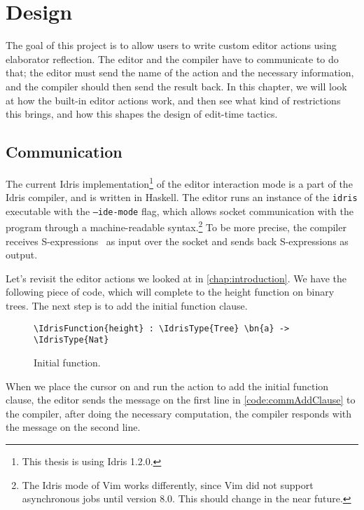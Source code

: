 \chapter{Design}\label{chap:design}
The goal of this project is to allow users to write custom editor actions using
elaborator reflection.
The editor and the compiler have to communicate to do that; the editor must
send the name of the action and the necessary information, and the
compiler should then send the result back.
In this chapter, we will look at how the built-in editor actions work, and then
see what kind of restrictions this brings, and how this shapes the design of
edit-time tactics.

\section{Communication}\label{sec:communication}

The current Idris implementation\footnote{This thesis is using Idris 1.2.0.} of
the editor interaction mode is a part of the Idris compiler, and is written in
Haskell.
The editor runs an instance of the \texttt{idris} executable with the
\texttt{--ide-mode} flag, which
allows socket communication with the program through a machine-readable
syntax.\footnote{The Idris mode of Vim works differently, since Vim did not
support asynchronous jobs until version 8.0. This should change in the near future.}
To be more precise, the compiler receives S-expressions~\cite{mccarthy} as input
over the socket and sends back S-expressions as output.

Let's revisit the editor actions we looked at in \autoref{chap:introduction}.
We have the following piece of code, which will complete to the height function
on binary trees. The next step is to add the initial function clause.

\begin{figure}[H]
\caption{Initial  function.}
\begin{Verbatim}[framesep=2mm, label=\footnotesize{\normalfont{Idris}}, labelposition=topline]
\IdrisFunction{height} : \IdrisType{Tree} \bn{a} -> \IdrisType{Nat}
\end{Verbatim}
\end{figure}

When we place the cursor on  and run the action to add the initial
function clause, the editor sends the message on the first line in
\autoref{code:commAddClause} to the compiler, after doing the necessary
computation, the compiler responds with the message on the second line.

